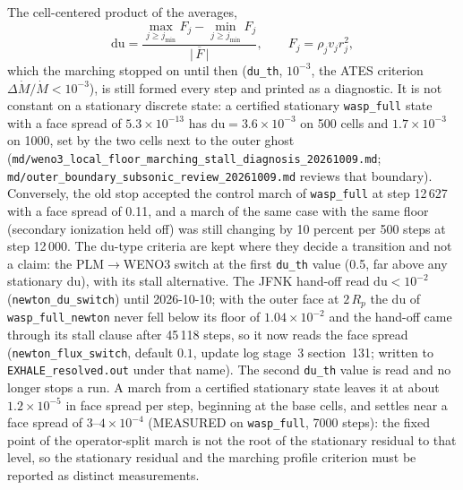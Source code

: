 The cell-centered product of the averages,
%
\begin{equation}
  \mathrm{du} = \frac{\max_{j\ge j_{\min}} F_j - \min_{j\ge j_{\min}} F_j}
                     {\bigl|\,\overline{F}\,\bigr|},
  \qquad F_j = \rho_j v_j r_j^2,
  \label{eq:du}
\end{equation}
%
which the marching stopped on until then (\texttt{du\_th}, $10^{-3}$, the
ATES criterion $\Delta\dot M/\dot M<10^{-3}$), is still formed every step and
printed as a diagnostic.  It is not constant on a stationary discrete state:
a certified stationary \texttt{wasp\_full} state with a face spread of
$5.3\times10^{-13}$ has $\mathrm{du}=3.6\times10^{-3}$ on 500 cells and
$1.7\times10^{-3}$ on 1000, set by the two cells next to the outer ghost
(\texttt{md/weno3\_local\_floor\_marching\_stall\_diagnosis\_20261009.md};
\texttt{md/outer\_boundary\_subsonic\_review\_20261009.md} reviews that
boundary).  Conversely, the old stop accepted the control march of
\texttt{wasp\_full} at step 12\,627 with a face spread of 0.11, and a march
of the same case with the same floor (secondary ionization held off) was
still changing by 10 percent per 500 steps at step 12\,000.  The du-type criteria are kept
where they decide a transition and not a claim: the PLM$\to$WENO3 switch at
the first \texttt{du\_th} value (0.5, far above any stationary du), with its
stall alternative.  The JFNK hand-off read $\mathrm{du}<10^{-2}$
(\texttt{newton\_du\_switch}) until 2026-10-10; with the outer face at
$2\,R_p$ the du of \texttt{wasp\_full\_newton} never fell below its floor of
$1.04\times10^{-2}$ and the hand-off came through its stall clause after
45\,118 steps, so it now reads the face spread (\texttt{newton\_flux\_switch},
default $0.1$, update log stage~3 section~131; written to
\texttt{EXHALE\_resolved.out} under that name).  The second \texttt{du\_th} value is read and no longer stops a
run.  A march from a certified stationary state leaves it at about
$1.2\times10^{-5}$ in face spread per step, beginning at the base cells, and
settles near a face spread of $3$--$4\times10^{-4}$ (MEASURED on
\texttt{wasp\_full}, 7000 steps): the fixed point of the operator-split march
is not the root of the stationary residual to that level, so the stationary residual and the marching profile criterion must be
reported as distinct measurements.


